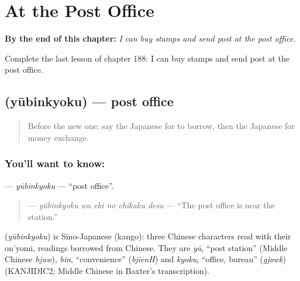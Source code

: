 
\chapter{At the Post Office}
\label{ch:ja-at-the-post-office}

\begin{chapteropening}
\textbf{By the end of this chapter:} \emph{I can buy stamps and send post at the post office.}

Complete the last lesson of chapter 188: I can buy stamps and send post at the post office.
\end{chapteropening}

\section[\texorpdfstring{\ja{ゆうびんきょく} (yūbinkyoku)}{ゆうびんきょく (yūbinkyoku)}]{ (yūbinkyoku) — post office}

\label{lesson:JA-C188-yuubinkyoku}



\begin{quote}
Before the new one: say the Japanese for to borrow, then the Japanese for money exchange.
\end{quote}

\subsection*{You'll want to know: }
\textbf{} — \emph{yūbinkyoku} — \textquotedblleft{}post office\textquotedblright{}.

\begin{quote}
\textbf{  } — \emph{yūbinkyoku wa eki no chikaku desu} — \textquotedblleft{}The post office is near the station.\textquotedblright{}
\end{quote}

\begin{cousinweb}
\textbf{} (\emph{yūbinkyoku}) is Sino-Japanese (kango): three Chinese characters read with their on'yomi, readings borrowed from Chinese. They are \emph{yū}, \textquotedblleft{}post station\textquotedblright{} (Middle Chinese \emph{hjuw}), \emph{bin}, \textquotedblleft{}convenience\textquotedblright{} (\emph{bjienH}) and \emph{kyoku}, \textquotedblleft{}office, bureau\textquotedblright{} (\emph{gjowk}) (KANJIDIC2; Middle Chinese in Baxter's transcription).
\end{cousinweb}

